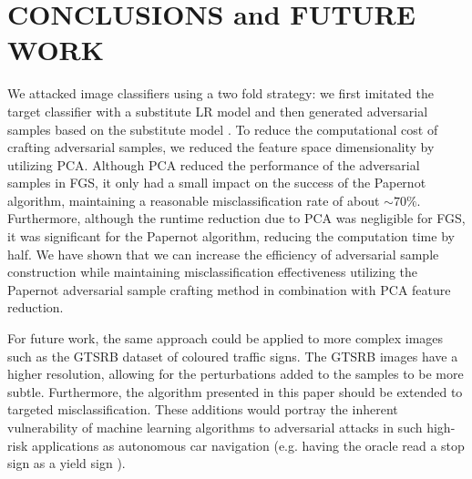 \section{CONCLUSIONS and FUTURE WORK}

We attacked image classifiers using a two fold strategy: we first imitated the target classifier with a substitute LR model and then generated adversarial samples based on the substitute model \cite{papernot3}. To reduce the computational cost of crafting adversarial samples, we reduced the feature space dimensionality by utilizing PCA. Although PCA reduced the performance of the adversarial samples in FGS, it only had a small impact on the success of the Papernot algorithm, maintaining a reasonable misclassification rate of about $\sim 70\%$. Furthermore, although the runtime reduction due to PCA was negligible for FGS, it was significant for the Papernot algorithm, reducing the computation time by half. We have shown that we can increase the efficiency of adversarial sample construction while maintaining misclassification effectiveness utilizing the Papernot adversarial sample crafting method in combination with PCA feature reduction. 



For future work, the same approach could be applied to more complex images such as the GTSRB dataset of coloured traffic signs. The GTSRB images have a higher resolution, allowing for the perturbations added to the samples to be more subtle. Furthermore, the algorithm presented in this paper should be extended to targeted misclassification. These additions would portray the inherent vulnerability of machine learning algorithms to adversarial attacks in such high-risk applications as autonomous car navigation (e.g. having the oracle read a stop sign as a yield sign \cite{papernot1}). 